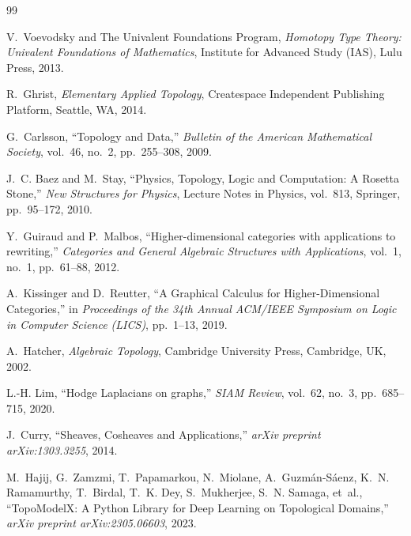 \documentclass[10pt,a4paper]{article}
\begin{document}
\begin{thebibliography}{99}

V.~Voevodsky and {The Univalent Foundations Program},
\emph{Homotopy Type Theory: Univalent Foundations of Mathematics},
Institute for Advanced Study (IAS), Lulu Press, 2013.

R.~Ghrist,
\emph{Elementary Applied Topology},
Createspace Independent Publishing Platform, Seattle, WA, 2014.

G.~Carlsson,
``Topology and Data,''
\emph{Bulletin of the American Mathematical Society}, vol.~46, no.~2, pp.~255--308, 2009.

J.~C. Baez and M.~Stay,
``Physics, Topology, Logic and Computation: A Rosetta Stone,''
\emph{New Structures for Physics}, Lecture Notes in Physics, vol.~813, Springer, pp.~95--172, 2010.

Y.~Guiraud and P.~Malbos,
``Higher-dimensional categories with applications to rewriting,''
\emph{Categories and General Algebraic Structures with Applications}, vol.~1, no.~1, pp.~61--88, 2012.

A.~Kissinger and D.~Reutter,
``A Graphical Calculus for Higher-Dimensional Categories,''
in \emph{Proceedings of the 34th Annual ACM/IEEE Symposium on Logic in Computer Science (LICS)}, pp.~1--13, 2019.

A.~Hatcher,
\emph{Algebraic Topology},
Cambridge University Press, Cambridge, UK, 2002.

L.-H. Lim,
``Hodge Laplacians on graphs,''
\emph{SIAM Review}, vol.~62, no.~3, pp.~685--715, 2020.

J.~Curry,
``Sheaves, Cosheaves and Applications,''
\emph{arXiv preprint arXiv:1303.3255}, 2014.

M.~Hajij, G.~Zamzmi, T.~Papamarkou, N.~Miolane, A.~Guzm{\'a}n-S{\'a}enz, K.~N. Ramamurthy, T.~Birdal, T.~K. Dey, S.~Mukherjee, S.~N. Samaga, et~al.,
``TopoModelX: A Python Library for Deep Learning on Topological Domains,''
\emph{arXiv preprint arXiv:2305.06603}, 2023.

\end{thebibliography}
\end{document}
